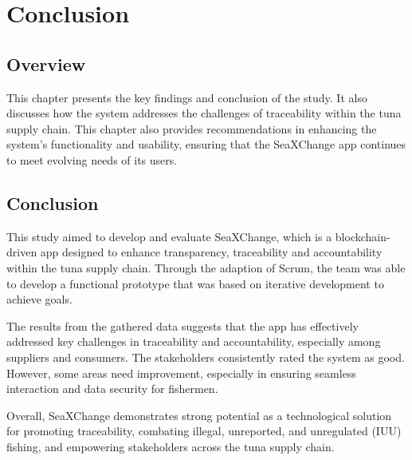 \chapter{Conclusion}
\vspace*{-1cm}  %
\section{Overview}
This chapter  presents the key findings and conclusion of the study. It also discusses how the system addresses the challenges of traceability within the tuna supply chain. This chapter also provides recommendations in enhancing the system's functionality and usability, ensuring that the SeaXChange app continues to meet evolving needs of its users. 


\section{Conclusion}
This study aimed to develop and evaluate SeaXChange, which is a blockchain-driven app designed to enhance transparency, traceability and accountability within the tuna supply chain. Through the adaption of Scrum, the team was able to develop a functional prototype that was based on iterative development to achieve goals. 

\noindent The results from the gathered data suggests that the app has effectively addressed key challenges in traceability and accountability, especially among suppliers and consumers. The stakeholders consistently rated the system as good. However, some areas need improvement, especially in ensuring seamless interaction and data security for fishermen.

\noindent Overall, SeaXChange demonstrates strong potential as a technological solution for promoting traceability, combating illegal, unreported, and unregulated (IUU) fishing, and empowering stakeholders across the tuna supply chain.

